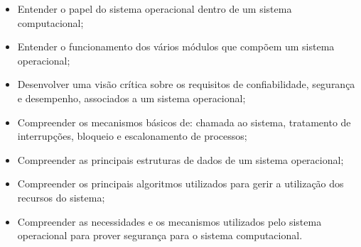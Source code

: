 \begin{itemize}

\item Entender o papel do sistema operacional dentro de um sistema computacional;

\item Entender o funcionamento dos vários módulos que compõem um sistema operacional;

\item Desenvolver uma visão crítica sobre os requisitos de confiabilidade, segurança e desempenho, associados a um sistema operacional;

\item Compreender os mecanismos básicos de: chamada ao sistema, tratamento de interrupções, bloqueio e escalonamento de processos;

\item Compreender as principais estruturas de dados de um sistema operacional;

\item Compreender os principais algoritmos utilizados para gerir a utilização dos recursos do sistema;

\item Compreender as necessidades e os mecanismos utilizados pelo sistema operacional para prover segurança para o sistema computacional.

\end{itemize} 







